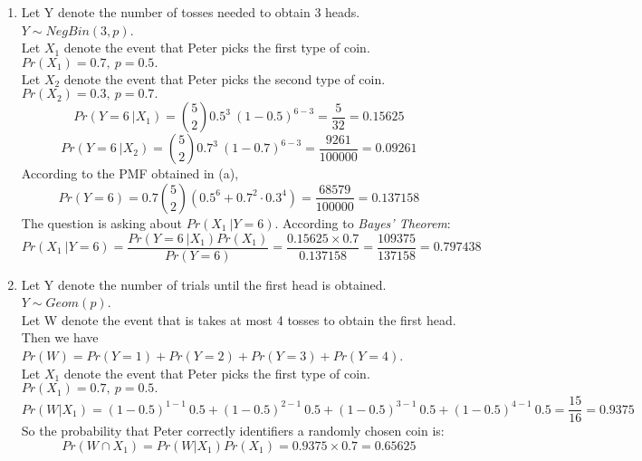 \documentclass[11pt]{article}
\begin{document}
\begin{enumerate}[label=\textbf{Question \arabic*:},start=1]
\begin{enumerate}
\begin{enumerate}
  \end{enumerate}

  \item Let Y denote the number of tosses needed to obtain 3 heads. \( Y \sim NegBin(3, p) \). \\
Let \( X_1 \) denote the event that Peter picks the first type of coin. \(Pr(X_1) = 0.7, \  p = 0.5.\) \\
Let \( X_2 \) denote the event that Peter picks the second type of coin. \( Pr(X_2) = 0.3, \ p = 0.7.\) \\
\[
Pr(Y=6 \ | X_1) = {5 \choose 2} 0.5^3 \ (1-0.5)^{6-3} = \frac{5}{32} = 0.15625
\]
\[
Pr(Y=6 \ | X_2) = {5 \choose 2} 0.7^3 \ (1-0.7)^{6-3} = \frac{9261}{100000} = 0.09261
\]
According to the PMF obtained in (a),
\[
Pr(Y = 6) = 0.7 {5 \choose 2} ( 0.5^6 + 0.7^2 \cdot 0.3^4 ) = \frac{68579}{100000} = 0.137158
\]
The question is asking about \( Pr(X_1 \ | Y = 6) \). According to \textit{Bayes' Theorem}:
\[
Pr(X_1 \ | Y = 6) = \frac{Pr(Y = 6 \  | X_1) Pr(X_1)}{Pr(Y = 6)} = \frac{0.15625 \times 0.7}{0.137158} = \frac{109375}{137158} = 0.797438
\]


  \item Let Y denote the number of trials until the first head is obtained. \( Y \sim Geom(p) \).\\
Let W denote the event that is takes at most 4 tosses to obtain the first head.\\
Then we have \( Pr(W) = Pr(Y = 1) + Pr(Y = 2) + Pr(Y = 3) + Pr(Y = 4)\). \\
Let \( X_1 \) denote the event that Peter picks the first type of coin. \(Pr(X_1) = 0.7, \  p = 0.5.\) \\
\[
Pr(W | X_1) = (1-0.5)^{1-1} \ 0.5 + (1-0.5)^{2-1}\ 0.5 + (1-0.5)^{3-1} \ 0.5 + (1 - 0.5)^{4-1} \ 0.5 = \frac{15}{16} = 0.9375
\]
So the probability that Peter correctly identifiers a randomly chosen coin is:
\[
Pr(W \cap X_1) = Pr(W | X_1) Pr(X_1) = 0.9375 \times 0.7 = 0.65625
\]
\end{enumerate}



\newpage



\end{enumerate}
\end{document}
